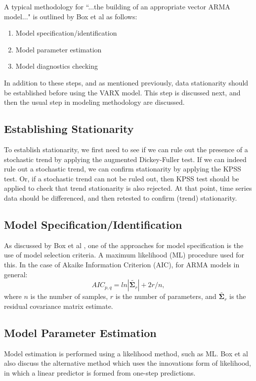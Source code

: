\documentclass[a4paper]{scrartcl}
\begin{document}
A typical methodology for ``...the building of an appropriate vector ARMA model..." is outlined by Box et al\cite[p. 478]{box_jenkins_reinsel_2008} as follows:
\begin{enumerate}
\item{Model specification/identification}
\item{Model parameter estimation}
\item{Model diagnostics checking}
\end{enumerate}

In addition to these steps, and as mentioned previously, data stationarity should be established before using the VARX model. This step is discussed next, and then the usual step in modeling methodology are discussed.

\subsection*{Establishing Stationarity}
To establish stationarity, we first need to see if we can rule out the presence of a stochastic trend by applying the augmented Dickey-Fuller test. If we can indeed rule out a stochastic trend, we can confirm stationarity by applying the KPSS test. Or, if a stochastic trend can not be ruled out, then KPSS test should be applied to check that trend stationarity is also rejected. At that point, time series data should be differenced, and then retested to confirm (trend) stationarity.

\subsection*{Model Specification/Identification}
As discussed by Box et al \cite[pg. 581]{box_jenkins_reinsel_2008}, one of the approaches for model specification is the use of model selection criteria. A maximum likelihood (ML) procedure used for this. In the case of Akaike Information Criterion (AIC), for ARMA models in general:
\begin{equation}
AIC_{p,q}=ln{|\tilde{\mathbf{\Sigma}_r}|}+2r/n,
\end{equation}
where $n$ is the number of samples, $r$ is the number of parameters, and  $\tilde{\mathbf{\Sigma}_r}$ is the residual covariance matrix estimate.

\subsection*{Model Parameter Estimation}
Model estimation is performed using a likelihood method, such as ML. Box et al also discuss the alternative method which uses the innovations form of likelihood, in which a linear predictor is formed from one-step predictions.
\end{document}
